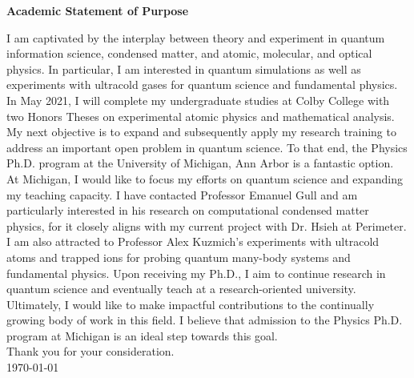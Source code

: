 \documentclass[12pt]{article}
\begin{document}
\begin{center}
	\textbf{Academic Statement of Purpose}
\end{center}
I am captivated by the interplay between theory and experiment in quantum information science, condensed matter, and atomic, molecular, and optical physics. In particular, I am interested in quantum simulations as well as experiments with ultracold gases for quantum science and fundamental physics. In May 2021, I will complete my undergraduate studies at Colby College with two Honors Theses on experimental atomic physics and mathematical analysis. My next objective is to expand and subsequently apply my research training to address an important open problem in quantum science. To that end, the Physics Ph.D. program at the University of Michigan, Ann Arbor is a fantastic option.  \\ 





At Michigan, I would like to focus my efforts on quantum science and expanding my teaching capacity. I have contacted Professor Emanuel Gull and am particularly interested in his research on computational condensed matter physics, for it closely aligns with my current project with Dr. Hsieh at Perimeter. I am also attracted to Professor Alex Kuzmich's experiments with ultracold atoms and trapped ions for probing quantum many-body systems and fundamental physics. Upon receiving my Ph.D., I aim to continue research in quantum science and eventually teach at a research-oriented university. Ultimately, I would like to make impactful contributions to the continually growing body of work in this field. I believe that admission to the Physics Ph.D. program at Michigan is an ideal step towards this goal. \\

\noindent Thank you for your consideration. \\

\noindent \today\\

	











	
	
	
	
	
\end{document}
